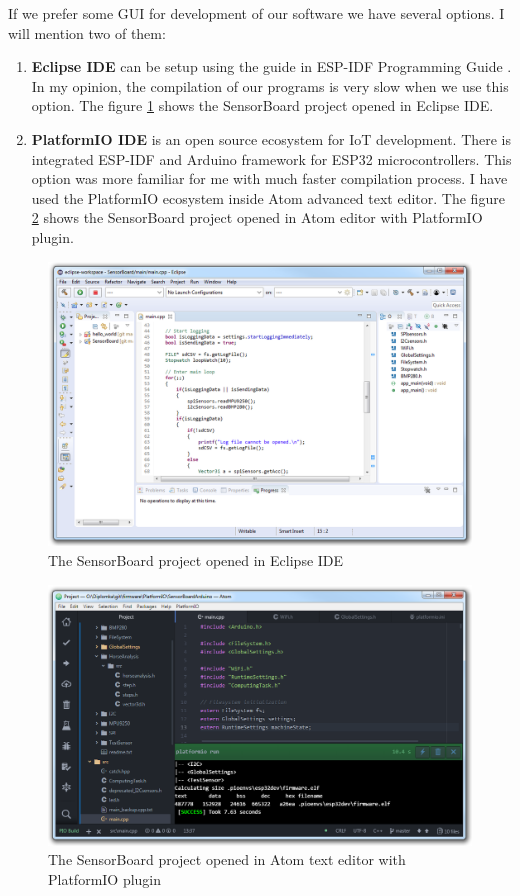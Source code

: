 If we prefer some GUI for development of our software we have several options. I will mention two of them:
\begin{enumerate}
	\item \textbf{Eclipse IDE} can be setup using the guide in ESP-IDF Programming Guide \cite{ESP32eclipse}. In my opinion, the compilation of our programs is very slow when we use this option. The figure \ref{ESP32eclipse} shows the SensorBoard project opened in Eclipse IDE.
	\item \textbf{PlatformIO IDE} is an open source ecosystem for IoT development. \cite{PlatformIO} There is integrated ESP-IDF and Arduino framework for ESP32 microcontrollers. This option was more familiar for me with much faster compilation process. I have used the PlatformIO ecosystem inside Atom \cite{AtomEditor} advanced text editor. The figure \ref{ESP32atom} shows the SensorBoard project opened in Atom editor with PlatformIO plugin.
\end{enumerate}

\begin{figure}
	\centering
	\label{ESP32eclipse}
	\caption{The SensorBoard project opened in Eclipse IDE}
	\includegraphics[width=16cm]{img/ESP32eclipse.png}
\end{figure}

\begin{figure}
	\centering
	\label{ESP32atom}
	\caption{The SensorBoard project opened in Atom text editor with PlatformIO plugin}
	\includegraphics[width=16cm]{img/ESP32atom.png}
\end{figure}

